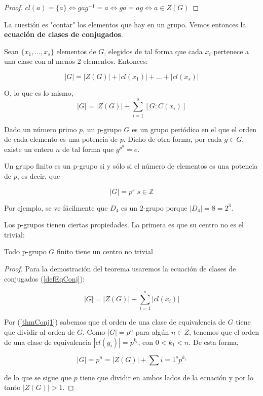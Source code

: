 \documentclass[nochap]{apuntes}
\begin{document}
\begin{proof}
$cl(a) = \{ a \} \iff gag^{-1} = a \iff ga = ag \iff a \in Z(G)$
\end{proof}

La cuestión es "contar" los elementos que hay en un grupo. Vemos entonces la \textbf{ecuación de clases de conjugados}.


\begin{defn}\label{defEqConj} Sean $\{ x_1, \hdots, x_s \}$ elementos de $G$, elegidos de tal forma que cada $x_i$ pertenece a una clase con al menos 2 elementos. Entonces:

\[  |G| = |Z(G)| + |cl(x_1)| + \hdots + |cl(x_s)| \]

O, lo que es lo mismo,
\[ |G| = |Z(G)| + \sum_{i=1}^{s}[G:C(x_i)] \]
\end{defn}

\begin{defn}[p-Grupo] Dado un número primo $p$, un p-grupo $G$ es un grupo periódico en el que el orden de cada elemento es una potencia de $p$. Dicho de otra forma, por cada $g∈G$, existe un entero $n$ de tal forma que $g^{p^n} = e$.

Un grupo finito es un p-grupo si y sólo si el número de elementos es una potencia de $p$, es decir, que

\[ |G| = p^s\;s∈ℤ \]
\end{defn}

Por ejemplo, se ve fácilmente que $D_4$ es un 2-grupo porque $|D_4| = 8 = 2^3$.

Los p-grupos tienen ciertas propiedades. La primera es que su centro no es el trivial:

\begin{theorem}
Todo p-grupo $G$ finito tiene un centro no trivial
\end{theorem}

\begin{proof} Para la demostración del teorema usaremos la ecuación de clases de conjugados (\ref{defEqConj}): 

\[  |G| = |Z(G)| + \sum_{i=1}^{s}|cl(x_i)| \]

Por (\ref{thmConj1}) sabemos que el orden de una clase de equivalencia de $G$ tiene que dividir al orden de $G$. Como $|G| = p^n$ para algún $n∈Z$, tenemos que el orden de una clase de equivalencia $|cl(g_i)| = p^{k_i}$, con $0<k_1<n$. De esta forma, 

\[ |G|= p^n = |Z(G)| + \sum{i=1}^s p^{k_i} \]

de lo que se sigue que $p$ tiene que dividir en ambos lados de la ecuación y por lo tanto $|Z(G)| > 1$.
\end{proof}
\end{document}
